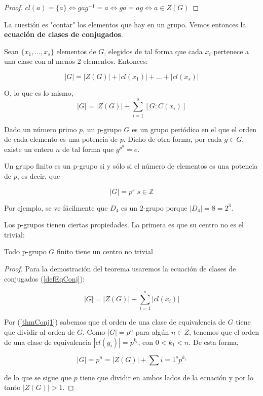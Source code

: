 \documentclass[nochap]{apuntes}
\begin{document}
\begin{proof}
$cl(a) = \{ a \} \iff gag^{-1} = a \iff ga = ag \iff a \in Z(G)$
\end{proof}

La cuestión es "contar" los elementos que hay en un grupo. Vemos entonces la \textbf{ecuación de clases de conjugados}.


\begin{defn}\label{defEqConj} Sean $\{ x_1, \hdots, x_s \}$ elementos de $G$, elegidos de tal forma que cada $x_i$ pertenece a una clase con al menos 2 elementos. Entonces:

\[  |G| = |Z(G)| + |cl(x_1)| + \hdots + |cl(x_s)| \]

O, lo que es lo mismo,
\[ |G| = |Z(G)| + \sum_{i=1}^{s}[G:C(x_i)] \]
\end{defn}

\begin{defn}[p-Grupo] Dado un número primo $p$, un p-grupo $G$ es un grupo periódico en el que el orden de cada elemento es una potencia de $p$. Dicho de otra forma, por cada $g∈G$, existe un entero $n$ de tal forma que $g^{p^n} = e$.

Un grupo finito es un p-grupo si y sólo si el número de elementos es una potencia de $p$, es decir, que

\[ |G| = p^s\;s∈ℤ \]
\end{defn}

Por ejemplo, se ve fácilmente que $D_4$ es un 2-grupo porque $|D_4| = 8 = 2^3$.

Los p-grupos tienen ciertas propiedades. La primera es que su centro no es el trivial:

\begin{theorem}
Todo p-grupo $G$ finito tiene un centro no trivial
\end{theorem}

\begin{proof} Para la demostración del teorema usaremos la ecuación de clases de conjugados (\ref{defEqConj}): 

\[  |G| = |Z(G)| + \sum_{i=1}^{s}|cl(x_i)| \]

Por (\ref{thmConj1}) sabemos que el orden de una clase de equivalencia de $G$ tiene que dividir al orden de $G$. Como $|G| = p^n$ para algún $n∈Z$, tenemos que el orden de una clase de equivalencia $|cl(g_i)| = p^{k_i}$, con $0<k_1<n$. De esta forma, 

\[ |G|= p^n = |Z(G)| + \sum{i=1}^s p^{k_i} \]

de lo que se sigue que $p$ tiene que dividir en ambos lados de la ecuación y por lo tanto $|Z(G)| > 1$.
\end{proof}
\end{document}
